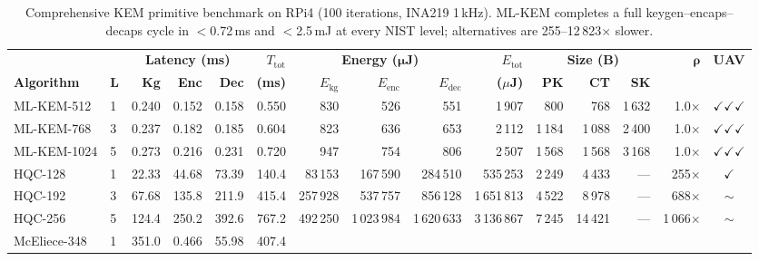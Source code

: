 \begin{table}[t]
\centering
\caption{Comprehensive KEM primitive benchmark on RPi4 (100 iterations, INA219 1\,kHz).
  ML-KEM completes a full keygen--encaps--decaps cycle in $<$0.72\,ms
  and $<$2.5\,mJ at every NIST level; alternatives are 255--12\,823$\times$ slower.}
\label{tab:kem_full}
\footnotesize
\setlength{\tabcolsep}{3pt}
\begin{tabular}{@{}ll rrr r rrr r rrr r c@{}}
\toprule
& & \multicolumn{3}{c}{\textbf{Latency (ms)}}
& \textbf{$T_\text{tot}$}
& \multicolumn{3}{c}{\textbf{Energy ($\boldsymbol{\mu}$J)}}
& \textbf{$E_\text{tot}$}
& \multicolumn{3}{c}{\textbf{Size (B)}}
& \textbf{$\boldsymbol{\rho}$}
& \textbf{UAV} \\
\cmidrule(lr){3-5}\cmidrule(lr){7-9}\cmidrule(lr){11-13}
\textbf{Algorithm} & \textbf{L}
 & \textbf{Kg} & \textbf{Enc} & \textbf{Dec}
 & \textbf{(ms)}
 & \textbf{$E_\text{kg}$} & \textbf{$E_\text{enc}$} & \textbf{$E_\text{dec}$}
 & \textbf{($\mu$J)}
 & \textbf{PK} & \textbf{CT} & \textbf{SK}
 &
 & \\
\midrule
ML-KEM-512   & 1 & 0.240 & 0.152 & 0.158 & 0.550
  &     830 &     526 &     551 &   1\,907
  &    800 &    768 & 1\,632
  & 1.0$\times$ & $\checkmark\!\checkmark\!\checkmark$ \\
ML-KEM-768   & 3 & 0.237 & 0.182 & 0.185 & 0.604
  &     823 &     636 &     653 &   2\,112
  &  1\,184 & 1\,088 & 2\,400
  & 1.0$\times$ & $\checkmark\!\checkmark\!\checkmark$ \\
ML-KEM-1024  & 5 & 0.273 & 0.216 & 0.231 & 0.720
  &     947 &     754 &     806 &   2\,507
  &  1\,568 & 1\,568 & 3\,168
  & 1.0$\times$ & $\checkmark\!\checkmark\!\checkmark$ \\
\addlinespace
HQC-128      & 1 & 22.33 & 44.68 & 73.39  & 140.4
  & 83\,153 & 167\,590 & 284\,510 & 535\,253
  & 2\,249 & 4\,433 & ---
  & 255$\times$ & $\checkmark$ \\
HQC-192      & 3 & 67.68 & 135.8 & 211.9  & 415.4
  & 257\,928 & 537\,757 & 856\,128 & 1\,651\,813
  & 4\,522 & 8\,978 & ---
  & 688$\times$ & $\sim$ \\
HQC-256      & 5 & 124.4 & 250.2 & 392.6  & 767.2
  & 492\,250 & 1\,023\,984 & 1\,620\,633 & 3\,136\,867
  & 7\,245 & 14\,421 & ---
  & 1\,066$\times$ & $\sim$ \\
\addlinespace
McEliece-348 & 1 & 351.0 & 0.466 & 55.98  & 407.4

\end{tabular}
\end{table}
